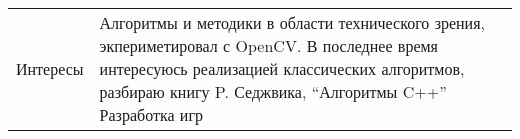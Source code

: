 \documentclass{article}
\begin{document}
\begin{tabular}{p{35mm}p{135mm}}
{\large{Интересы}} \rule{0pt}{1cm} &
Алгоритмы и методики в области технического зрения, экпериметировал с OpenCV.
В последнее время интересуюсь реализацией классических алгоритмов,
разбираю книгу P. Седжвика, ``Алгоритмы C++''
Разработка игр \\

\end{tabular}
\end{document}
